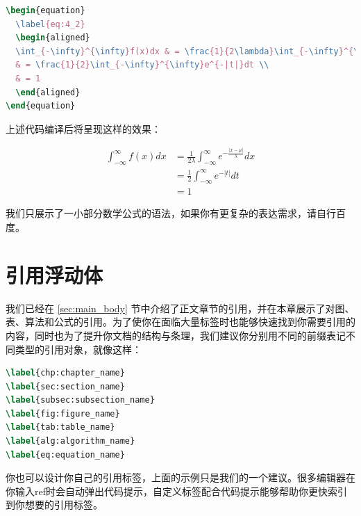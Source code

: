 \begin{tcolorbox}
\begin{lstlisting}[language=TeX]
\begin{equation}
  \label{eq:4_2}
  \begin{aligned}
  \int_{-\infty}^{\infty}f(x)dx & = \frac{1}{2\lambda}\int_{-\infty}^{\infty}e^{-\frac{|x-\mu|}{\lambda}}dx \\
  & = \frac{1}{2}\int_{-\infty}^{\infty}e^{-|t|}dt \\
  & = 1
  \end{aligned}
\end{equation}
\end{lstlisting}
\end{tcolorbox}

\noindent 上述代码编译后将呈现这样的效果：

\begin{equation}
  \label{eq:4_2}
  \begin{aligned}
  \int_{-\infty}^{\infty}f(x)dx & = \frac{1}{2\lambda}\int_{-\infty}^{\infty}e^{-\frac{|x-\mu|}{\lambda}}dx \\
  & = \frac{1}{2}\int_{-\infty}^{\infty}e^{-|t|}dt \\
  & = 1
  \end{aligned}
\end{equation}

我们只展示了一小部分数学公式的语法，如果你有更复杂的表达需求，请自行百度。

\section{引用浮动体}

我们已经在 \ref{sec:main_body} 节中介绍了正文章节的引用，并在本章展示了对图、表、算法和公式的引用。为了使你在面临大量标签时也能够快速找到你需要引用的内容，同时也为了提升你文档的结构与条理，我们建议你分别用不同的前缀表记不同类型的引用对象，就像这样：

\begin{tcolorbox}
\begin{lstlisting}[language=TeX]
\label{chp:chapter_name}
\label{sec:section_name}
\label{subsec:subsection_name}
\label{fig:figure_name}
\label{tab:table_name}
\label{alg:algorithm_name}
\label{eq:equation_name}
\end{lstlisting}
\end{tcolorbox}

\noindent 你也可以设计你自己的引用标签，上面的示例只是我们的一个建议。很多编辑器在你输入{\codefont ref}时会自动弹出代码提示，自定义标签配合代码提示能够帮助你更快索引到你想要的引用标签。


